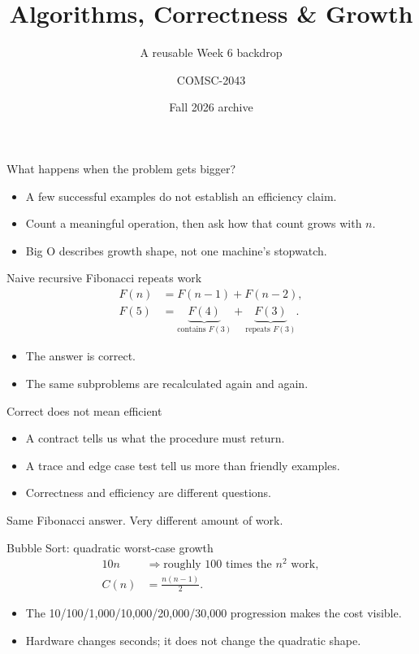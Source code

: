 \documentclass[aspectratio=169]{beamer}
\title{Algorithms, Correctness \& Growth}
\subtitle{A reusable Week 6 backdrop}
\author{COMSC-2043}
\date{Fall 2026 archive}
\begin{document}
\begin{frame}
  \titlepage
\end{frame}

\begin{frame}{What happens when the problem gets bigger?}
  \begin{itemize}
    \item A few successful examples do not establish an efficiency claim.
    \item Count a meaningful operation, then ask how that count grows with $n$.
    \item Big O describes growth shape, not one machine's stopwatch.
  \end{itemize}
\end{frame}

\begin{frame}{Naive recursive Fibonacci repeats work}
  \begin{align*}
    F(n) &= F(n-1)+F(n-2),\\
    F(5) &= \underbrace{F(4)}_{\text{contains }F(3)}+\underbrace{F(3)}_{\text{repeats }F(3)}.
  \end{align*}
  \begin{itemize}
    \item The answer is correct.
    \item The same subproblems are recalculated again and again.
  \end{itemize}
\end{frame}

\begin{frame}{Correct does not mean efficient}
  \begin{itemize}
    \item A contract tells us what the procedure must return.
    \item A trace and edge case test tell us more than friendly examples.
    \item Correctness and efficiency are different questions.
  \end{itemize}
  \vfill
  \centering
  \Large Same Fibonacci answer. Very different amount of work.
\end{frame}

\begin{frame}{Bubble Sort: quadratic worst-case growth}
  \begin{align*}
    10n &\Rightarrow \text{roughly }100\text{ times the }n^2\text{ work},\\
    C(n) &= \frac{n(n-1)}{2}.
  \end{align*}
  \begin{itemize}
    \item The 10/100/1,000/10,000/20,000/30,000 progression makes the cost visible.
    \item Hardware changes seconds; it does not change the quadratic shape.
  \end{itemize}
\end{frame}
\end{document}
